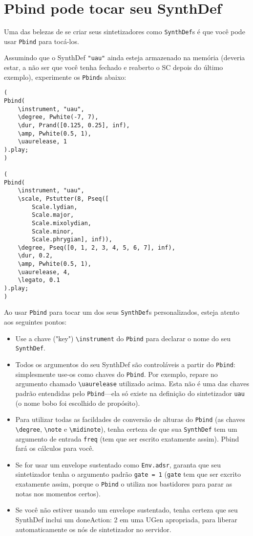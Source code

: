 \section{Pbind pode tocar seu SynthDef}

Uma das belezas de se criar seus sintetizadores como \texttt{SynthDef}s é que você pode usar \texttt{Pbind} para tocá-los.

Assumindo que o SynthDef \texttt{"uau"} ainda esteja armazenado na memória (deveria estar, a não ser que você tenha fechado e reaberto o SC depois do último exemplo), experimente os \texttt{Pbind}s abaixo:

\begin{lstlisting}[style=SuperCollider-IDE, basicstyle=\scttfamily\footnotesize]
(
Pbind(
	\instrument, "uau",
	\degree, Pwhite(-7, 7),
	\dur, Prand([0.125, 0.25], inf),
	\amp, Pwhite(0.5, 1),
	\uaurelease, 1
).play;
)

(
Pbind(
	\instrument, "uau",
	\scale, Pstutter(8, Pseq([
		Scale.lydian,
		Scale.major,
		Scale.mixolydian,
		Scale.minor,
		Scale.phrygian], inf)),
	\degree, Pseq([0, 1, 2, 3, 4, 5, 6, 7], inf),
	\dur, 0.2,
	\amp, Pwhite(0.5, 1),
	\uaurelease, 4,
	\legato, 0.1
).play;
)
\end{lstlisting}
 
Ao usar \texttt{Pbind} para tocar um dos seus \texttt{SynthDef}s personalizados, esteja atento aos seguintes pontos:

\begin{itemize}
\item Use a chave ("key") \texttt{\textbackslash instrument} do \texttt{Pbind} para declarar o nome do seu \texttt{SynthDef}.
\item Todos os argumentos do seu SynthDef são controláveis a partir do \texttt{Pbind}: simplesmente use-os como chaves do \texttt{Pbind}. Por exemplo, repare no argumento chamado \texttt{\textbackslash uaurelease} utilizado acima. Esta não é uma das chaves padrão entendidas pelo \texttt{Pbind}---ela só existe na definição do sintetizador  \texttt{uau} (o nome bobo foi escolhido de propósito).

\item Para utilizar todas as facildades de conversão de alturas do \texttt{Pbind} (as chaves \texttt{\textbackslash degree}, \texttt{\textbackslash note} e \texttt{\textbackslash midinote}), tenha certeza de que sua \texttt{SynthDef} tem um argumento de entrada \texttt{freq} (tem que ser escrito exatamente assim). Pbind fará os cálculos para você.
\item Se for usar um envelope sustentado como \texttt{Env.adsr}, garanta que seu sintetizador tenha o argumento padrão \texttt{gate = 1} (\texttt{gate} tem que ser excrito exatamente assim, porque o \texttt{Pbind} o utiliza nos bastidores para parar as notas nos momentos certos).
\item Se você não estiver usando um envelope sustentado, tenha certeza que seu SynthDef inclui um doneAction: 2 em uma UGen apropriada, para liberar automaticamente os nós de sintetizador no servidor.
\end{itemize}

